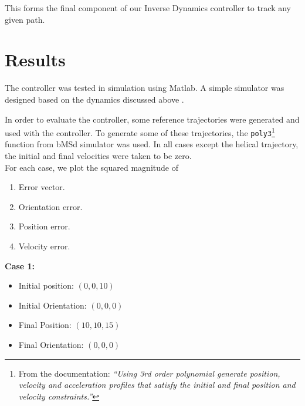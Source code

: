 \documentclass[12pt,fleqn]{article}
\begin{document}
This forms the final component of our Inverse Dynamics controller to
track any given path.

\section{Results}

The controller was tested in simulation using Matlab. A simple simulator
was designed based on the dynamics discussed above \cite{github}.

In order to evaluate the controller, some reference trajectories were
generated and used with the controller. To generate some of these
trajectories, the \texttt{poly3}\footnote{From the documentation:
\textit{``Using 3rd order polynomial generate position, velocity and
acceleration profiles that satisfy the initial and final position and
velocity constraints.''}} function from bMSd simulator
\cite{courseWeb} was used. In all cases except the helical trajectory, the initial and final
velocities were taken to be zero. \\

For each case, we plot the squared magnitude of 
\begin{enumerate}
\item Error vector.
\item Orientation error.
\item Position error.
\item Velocity error.
\end{enumerate}
\newpage
\textbf{Case 1:}
\begin{itemize}
\item Initial position: $(0,0,10)$
\item Initial Orientation: $(0,0,0)$
\item Final Position: $(10,10,15)$
\item Final Orientation: $(0,0,0)$
\end{itemize}
\end{document}
